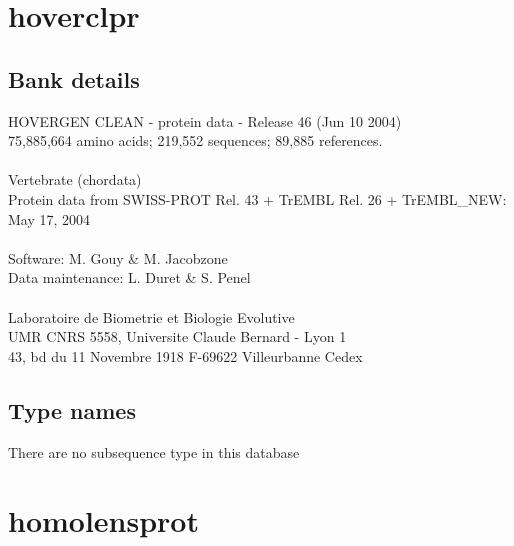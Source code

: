 \documentclass{article}
\begin{document}
\begin{Schunk}
\section{ hoverclpr }
\subsection{Bank details}
HOVERGEN CLEAN - protein data - Release 46 (Jun 10 2004)\\
75,885,664 amino acids; 219,552 sequences; 89,885 references.\\
\\
Vertebrate (chordata)	\\
Protein data from SWISS-PROT Rel. 43  + TrEMBL Rel. 26 + TrEMBL\_NEW: May 17, 2004\\
\\
Software: M. Gouy \& M. Jacobzone\\
Data maintenance: L. Duret \& S. Penel\\
\\
Laboratoire de Biometrie et Biologie Evolutive\\
UMR CNRS 5558, Universite Claude Bernard - Lyon 1\\
43, bd du 11 Novembre 1918 F-69622 Villeurbanne Cedex\\


\subsection{Type names}
There are no subsequence type in this database
\section{ homolensprot }

\end{Schunk}
\end{document}
